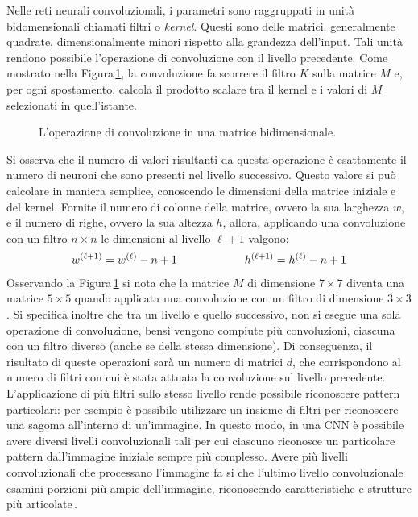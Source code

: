 Nelle reti neurali convoluzionali, i parametri sono raggruppati in unità bidomensionali chiamati filtri o \textit{kernel}. Questi sono delle matrici, generalmente quadrate, dimensionalmente minori rispetto alla grandezza dell'input. Tali unità rendono possibile l'operazione di convoluzione con il livello precedente. Come mostrato nella Figura\,\ref{fig:convolution-operation}, la convoluzione fa scorrere il filtro $K$ sulla matrice $M$ e, per ogni spostamento, calcola il prodotto scalare tra il kernel e i valori di $M$ selezionati in quell'istante.
% 
\begin{figure}[!b]
    \centering
    
    \caption[L'operazione di convoluzione in una matrice bidimensionale.]{L'operazione di convoluzione in una matrice bidimensionale.}\label{fig:convolution-operation}
\end{figure}
% 
Si osserva che il numero di valori risultanti da questa operazione è esattamente il numero di neuroni che sono presenti nel livello successivo. Questo valore si può calcolare in maniera semplice, conoscendo le dimensioni della matrice iniziale e del kernel. Fornite il numero di colonne della matrice, ovvero la sua larghezza $w$, e il numero di righe, ovvero la sua altezza $h$, allora, applicando una convoluzione con un filtro $n \times n$ le dimensioni al livello $\ell + 1$ valgono:
% 
\begin{gather*}
    w^{(\ell + 1)} = w^{(\ell)} - n + 1
    \hspace{60px}
    h^{(\ell + 1)} = h^{(\ell)} - n + 1
\end{gather*}
% 
Osservando la Figura\,\ref{fig:convolution-operation} si nota che la matrice $M$ di dimensione $7\times 7$ diventa una matrice $5 \times 5$ quando applicata una convoluzione con un filtro di dimensione $3\times 3$. Si specifica inoltre che tra un livello e quello successivo, non si esegue una sola operazione di convoluzione, bensì vengono compiute più convoluzioni, ciascuna con un filtro diverso (anche se della stessa dimensione). Di conseguenza, il risultato di queste operazioni sarà un numero di matrici $d$, che corrispondono al numero di filtri con cui è stata attuata la convoluzione sul livello precedente. L'applicazione di più filtri sullo stesso livello rende possibile riconoscere pattern particolari: per esempio è possibile utilizzare un insieme di filtri per riconoscere una sagoma all'interno di un'immagine. In questo modo, in una \acs{CNN} è possibile avere diversi livelli convoluzionali tali per cui ciascuno riconosce un particolare pattern dall'immagine iniziale sempre più complesso. Avere più livelli convoluzionali che processano l'immagine fa si che l'ultimo livello convoluzionale esamini porzioni più ampie dell'immagine, riconoscendo caratteristiche e strutture più articolate\,\cite{aggarwal2018neural, wu2017introduction}.
